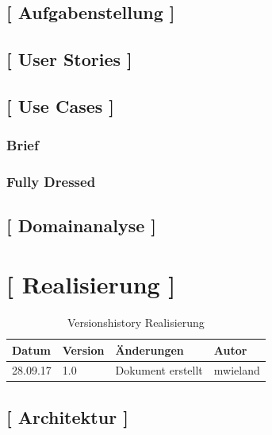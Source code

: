 \documentclass[11pt,a4paper,english,oneside]{book}
\numberwithin{equation}{chapter}
\begin{document}
	\section{[ Aufgabenstellung ]}
	
	\section{[ User Stories ]}
	
	\section{[ Use Cases ]}
	
	\subsection{Brief}
	
	\subsection{Fully Dressed}
	
	\section{[ Domainanalyse ]}
	
	
	
	
	\chapter{ [ Realisierung ]}
	
		\begin{table}[h!]
		\centering
		\begin{tabularx}{\linewidth}{l l X l}
			\toprule 
			Datum & Version & Änderungen & Autor \\
			\midrule
			28.09.17 & 1.0 & Dokument erstellt & mwieland \\
			\bottomrule 
		\end{tabularx} 
		\caption{Versionshistory Realisierung} 
		\end{table}
	
	\section{ [ Architektur ] }
	
\end{document}
